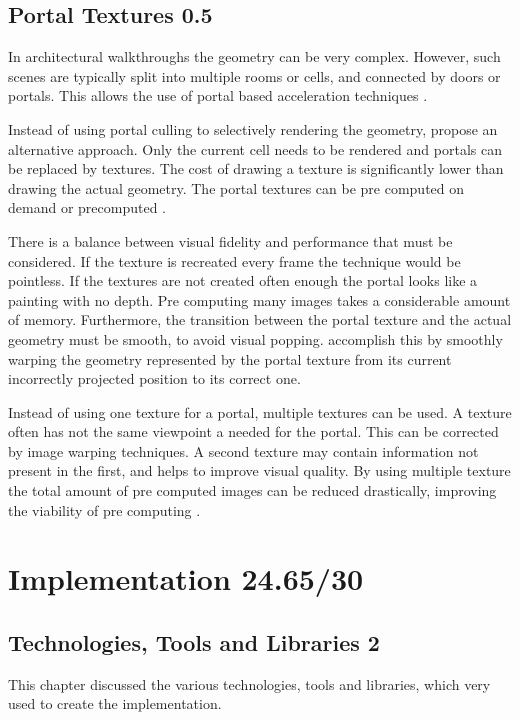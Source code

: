 \subsection{Portal Textures 0.5}
In architectural walkthroughs the geometry can be very complex. However, such scenes are typically split into multiple rooms or cells, and connected by doors or portals. This allows the use of portal based acceleration techniques \cite{aliaga:1997:architectural}.

Instead of using portal culling to selectively rendering the geometry, \textcite{aliaga:1997:architectural} propose an alternative approach. Only the current cell needs to be rendered and portals can be replaced by textures. The cost of drawing a texture is significantly lower than drawing the actual geometry. The portal textures can be pre computed on demand or precomputed \cite{aliaga:1997:architectural}. 

There is a balance between visual fidelity and performance that must be considered. If the texture is recreated every frame the technique would be pointless. If the textures are not created often enough the portal looks like a painting with no depth. Pre computing many images takes a considerable amount of memory. Furthermore, the transition between the portal texture and the actual geometry must be smooth, to avoid visual popping. \textcite{aliaga:1997:architectural} accomplish this by smoothly warping the geometry represented by the portal texture from its current incorrectly projected position to its correct one.

Instead of using one texture for a portal, multiple textures can be used. A texture often has not the same viewpoint a needed for the portal. This can be corrected by image warping techniques. A second texture may contain information not present in the first, and helps to improve visual quality. By using multiple texture the total amount of pre computed images can be reduced drastically, improving the viability of pre computing \cite{rafferty:1998:3d}.


\section{Implementation 24.65/30}

\subsection{Technologies, Tools and Libraries 2}
This chapter discussed the various technologies, tools and libraries, which very used to create the implementation.

